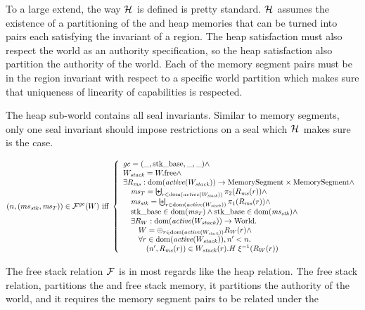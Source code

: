 \begin{jversion}
To a large extend, the way $\lrheap$ is defined is pretty standard.
$\lrheap$ assumes the existence of a partitioning of the \trgcm{} and \srccm{} heap memories that can be turned into pairs each satisfying the invariant of a region.
The heap satisfaction must also respect the world as an authority specification, so the heap satisfaction also partition the authority of the world.
Each of the memory segment pairs must be in the region invariant with respect to a specific world partition which makes sure that uniqueness of linearity of capabilities is respected.

The heap sub-world contains all seal invariants.
Similar to memory segments, only one seal invariant should impose restrictions on a seal which $\lrheap$ makes sure is the case.
\begin{definition}
\label{def:free-stack-rel}
\[
  \memSatFStack{ms_\stk,\ms_T}{W} \text{ iff } 
  \left\{
    \begin{array}{l}
      \gc = (\_,\stkb,\_,\_) \wedge\\
      W_\var{stack} = \pwfree \wedge \\
      \exists R_\ms : \dom(\activeReg{W_\var{stack}}) \fun \MemSeg \times \MemSeg \wedge \\
      \quad \ms_T = \biguplus_{r \in \dom(\activeReg{W_\var{stack}})} \pi_2(R_\ms(r)) \wedge \\
      \quad \ms_\stk = \biguplus_{r \in \dom(\activeReg{W_\var{stack}})} \pi_1(R_\ms(r)) \wedge \\
      \quad \stkb \in \dom(\ms_T) \wedge \stkb \in \dom(\ms_\stk) \wedge \\
      \quad \exists R_W : \dom(\activeReg{W_\var{stack}}) \fun \World\ldotp\\
      \qquad W = \oplus_{r \in \dom(\activeReg{W_\var{stack}})} R_W(r) \wedge\\
      \qquad \forall r \in \dom(\activeReg{W_\var{stack}}),n' < n \ldotp \\
      \qquad \quad \npair[n']{R_\ms(r)} \in  W_\var{stack}(r).H \; \xi^{-1}(R_W(r))
    \end{array}
  \right.
\]
\end{definition}
The free stack relation $\lrfree[]$ is in most regards like the heap relation.
The free stack relation, partitions the \srccm{} and \trccm free stack memory, it partitions the authority of the world, and it requires the memory segment pairs to be related under the
\begin{definition}

\end{definition}
\end{jversion}
